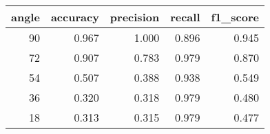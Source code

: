 \begin{tabular}{rrrrr}
\toprule
angle & accuracy & precision & recall & f1\_score \\
\midrule
90 & 0.967 & 1.000 & 0.896 & 0.945 \\
72 & 0.907 & 0.783 & 0.979 & 0.870 \\
54 & 0.507 & 0.388 & 0.938 & 0.549 \\
36 & 0.320 & 0.318 & 0.979 & 0.480 \\
18 & 0.313 & 0.315 & 0.979 & 0.477 \\
\bottomrule
\end{tabular}

